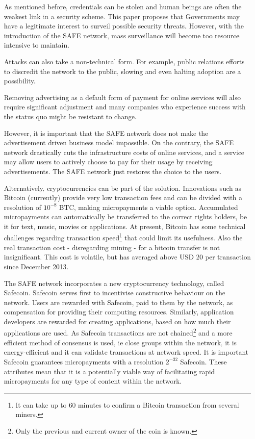 \documentclass[twocolumn,english]{article}
\begin{document}
As mentioned before, credentials can be stolen and human beings are often the weakest link in a security scheme.  This paper proposes that Governments may have a legitimate interest to surveil possible security threats.  However, with the introduction of the SAFE network, mass surveillance will become too resource intensive to maintain.

Attacks can also take a non-technical
form. For example, public relations efforts to discredit the network
to the public, slowing and even halting adoption are a possibility.

Removing advertising as a default form of payment for online services will
also require significant adjustment and many companies who experience success with the status quo might be resistant to
change.

However, it is important that the SAFE network does not make the advertisement driven business model impossible.  On the contrary, the SAFE network drastically cuts the infrastructure costs of online services, and a service may allow users to actively choose to pay for their usage by receiving advertisements.  The SAFE network just restores the choice to the users.


Alternatively, cryptocurrencies can be part of the solution. Innovations such as Bitcoin (currently) provide very low transaction fees and can be divided with a resolution of $10^{-8}$ BTC, making micropayments a viable option. Accumulated micropayments can automatically be transferred to the correct rights holders, be it for text, music, movies or applications. At present, Bitcoin has some technical challenges regarding transaction speed\footnote{It can take up to 60 minutes to confirm a Bitcoin transaction from several miners.} that could limit its usefulness. Also the real transaction cost - disregarding mining - for a bitcoin transfer is not insignificant. This cost is volatile, but has averaged above USD 20 per transaction since December 2013\cite{blockchain14}.

The SAFE network incorporates a new cryptocurrency technology, called Safecoin.  Safecoin serves first to incentivise constructive behaviour on the network. Users are rewarded with Safecoin, paid to them by the network, as compensation for providing their computing resources. Similarly, application developers are rewarded for creating applications, based on how much their applications are used. As Safecoin transactions are not chained\footnote{Only the previous and current owner of the coin is known.} and a more efficient method of consensus is used, ie close groups within the network, it is energy-efficient and it can validate transactions at network speed. It is important Safecoin guarantees micropayments with a resolution $2^{-32}$ Safecoin. These attributes mean that it is a potentially viable way of facilitating rapid micropayments for any type of content within the network.
\end{document}
